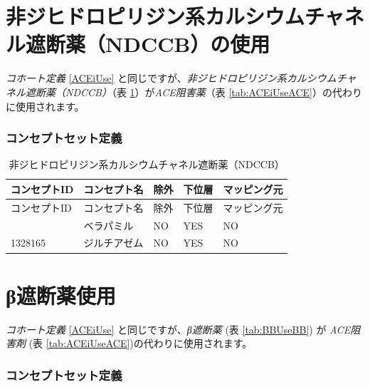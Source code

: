 \documentclass[
  11pt]{book}
\theoremstyle{definition}
\theoremstyle{definition}
\theoremstyle{definition}
\theoremstyle{definition}
\theoremstyle{remark}
\begin{document}
\section{非ジヒドロピリジン系カルシウムチャネル遮断薬（NDCCB）の使用}\label{ndCCBUse}

\emph{コホート定義} \ref{ACEiUse} と同じですが、\emph{非ジヒドロピリジン系カルシウムチャネル遮断薬（NDCCB）}（表 \ref{tab:ndCCBUsendCCB}）が\emph{ACE阻害薬}（表 \ref{tab:ACEiUseACE}）の代わりに使用されます。

\subsubsection*{コンセプトセット定義}\label{ux30b3ux30f3ux30bbux30d7ux30c8ux30bbux30c3ux30c8ux5b9aux7fa9-10}

\begin{longtable}[]{@{}lllll@{}}
\caption{\label{tab:ndCCBUsendCCB} 非ジヒドロピリジン系カルシウムチャネル遮断薬（NDCCB）}\tabularnewline
\toprule\noalign{}
コンセプトID & コンセプト名 & 除外 & 下位層 & マッピング元 \\
\midrule\noalign{}
\endfirsthead
\toprule\noalign{}
コンセプトID & コンセプト名 & 除外 & 下位層 & マッピング元 \\
\midrule\noalign{}
\endhead
\bottomrule\noalign{}
\endlastfoot
1307863 & ベラパミル & NO & YES & NO \\
1328165 & ジルチアゼム & NO & YES & NO \\
\end{longtable}

\section{β遮断薬使用}\label{BBUse}

\emph{コホート定義} \ref{ACEiUse} と同じですが、\emph{β遮断薬} (表 \ref{tab:BBUseBB}) が \emph{ACE阻害剤} (表 \ref{tab:ACEiUseACE})の代わりに使用されます。

\subsubsection*{コンセプトセット定義}\label{ux30b3ux30f3ux30bbux30d7ux30c8ux30bbux30c3ux30c8ux5b9aux7fa9-11}
\end{document}
